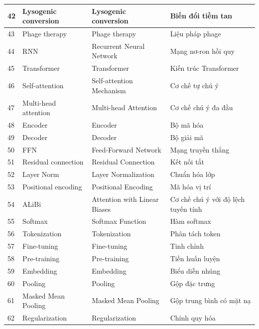 \begin{longtable}{|m{0.6cm}|m{3cm}|m{5.5cm}|m{5.5cm}|}
42 & Lysogenic conversion & Lysogenic conversion & Biến đổi tiềm tan \\    \hline
43 & Phage therapy & Phage therapy & Liệu pháp phage \\    \hline
44 & RNN & Recurrent Neural Network & Mạng nơ-ron hồi quy \\    \hline
45 & Transformer & Transformer & Kiến trúc Transformer \\    \hline
46 & Self-attention & Self-attention Mechanism & Cơ chế tự chú ý \\    \hline
47 & Multi-head attention & Multi-head Attention & Cơ chế chú ý đa đầu \\    \hline
48 & Encoder & Encoder & Bộ mã hóa \\    \hline
49 & Decoder & Decoder & Bộ giải mã \\    \hline
50 & FFN & Feed-Forward Network & Mạng truyền thẳng \\    \hline
51 & Residual connection & Residual Connection & Kết nối tắt \\    \hline
52 & Layer Norm & Layer Normalization & Chuẩn hóa lớp \\    \hline
53 & Positional encoding & Positional Encoding & Mã hóa vị trí \\    \hline
54 & ALiBi & Attention with Linear Biases & Cơ chế chú ý với độ lệch tuyến tính \\    \hline
55 & Softmax & Softmax Function & Hàm softmax \\    \hline
56 & Tokenization & Tokenization & Phân tách token \\    \hline
57 & Fine-tuning & Fine-tuning & Tinh chỉnh \\    \hline
58 & Pre-training & Pre-training & Tiền huấn luyện \\    \hline
59 & Embedding & Embedding & Biểu diễn nhúng \\    \hline
60 & Pooling & Pooling & Gộp đặc trưng \\    \hline
61 & Masked Mean Pooling & Masked Mean Pooling & Gộp trung bình có mặt nạ \\    \hline
62 & Regularization & Regularization & Chính quy hóa \\    \hline

\end{longtable}